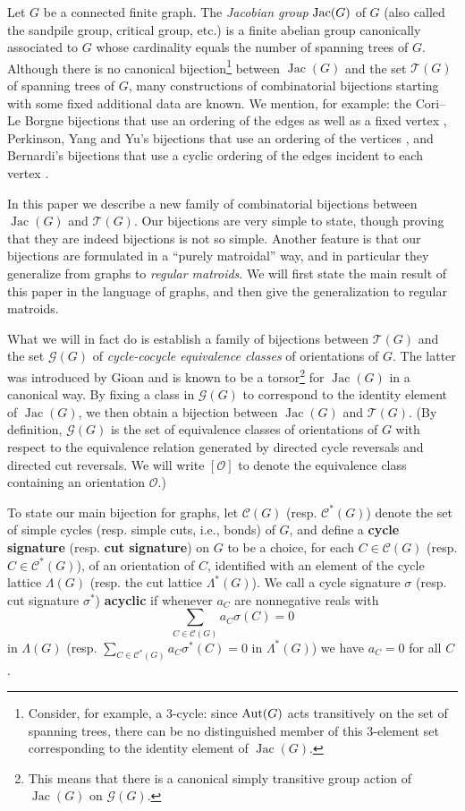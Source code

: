 \documentclass[12pt]{amsart}
\numberwithin{equation}{section}
\theoremstyle{definition}
\newcommand{\Jac}{\operatorname{Jac}}
\begin{document}
Let $G$ be a connected finite graph.
The {\em Jacobian group} ${\rm Jac}(G)$ of $G$ (also called the sandpile group, critical group, etc.) is a finite abelian group canonically associated to $G$ whose cardinality equals the number of spanning trees of $G$. Although there is no canonical bijection\footnote{Consider, for example, a 3-cycle: since ${\rm Aut}(G)$ acts transitively on the set of spanning trees, there can be no distinguished member of this 3-element set corresponding to the identity element of $\Jac(G)$.} between $\Jac(G)$ and the set ${\mathcal T}(G)$ of spanning trees of $G$, many constructions of combinatorial bijections starting with some fixed additional data are known.  We mention, for example: the Cori--Le Borgne bijections that use an ordering of the edges as well as a fixed vertex \cite{cori2001burning}, Perkinson, Yang and Yu's bijections that use an ordering of the vertices \cite{perkinson2015dfs}, and Bernardi's bijections that use a cyclic ordering of the edges incident to each vertex \cite{bernardi2008tutte}.

In this paper we describe a new family of combinatorial bijections between $\Jac(G)$ and ${\mathcal T}(G)$.  Our bijections are very simple to state, though proving that they are indeed bijections is not so simple.  Another feature is that our bijections are formulated in a ``purely matroidal'' way, and in particular they generalize from graphs to {\em regular matroids}.  We will first state the main result of this paper in the language of graphs, and then give the generalization to regular matroids.

What we will in fact do is establish a family of bijections between ${\mathcal T}(G)$ and the set ${\mathcal G}(G)$ of {\em cycle-cocycle equivalence classes} of orientations of $G$.  The latter was introduced by Gioan \cite{gioan2007enumerating,gioan2008circuit} and is known to be a torsor\footnote{This means that there is a canonical simply transitive group action of $\Jac(G)$ on ${\mathcal G}(G)$.} for $\Jac(G)$ in a canonical way. By fixing a class in ${\mathcal G}(G)$ to correspond to the identity element of $\Jac(G)$, we then obtain a bijection between $\Jac(G)$ and ${\mathcal T}(G)$. (By definition, ${\mathcal G}(G)$ is the set of equivalence classes of orientations of $G$ with respect to the equivalence relation generated by directed cycle reversals and directed cut reversals. We will write $[{\mathcal O}]$ to denote the equivalence class containing an orientation ${\mathcal O}$.)

To state our main bijection for graphs, let ${\mathcal C}(G)$ (resp. ${\mathcal C}^*(G)$) denote the set of simple cycles (resp. simple cuts, i.e., bonds) of $G$, and define a {\bf cycle signature} (resp. {\bf cut signature}) on $G$ to be a choice, for each $C \in {\mathcal C}(G)$ (resp. $C \in {\mathcal C}^*(G)$), of an orientation of $C$, identified with an element of the cycle lattice $\Lambda(G)$ (resp. the cut lattice $\Lambda^*(G)$). We call a cycle signature $\sigma$ (resp. cut signature $\sigma^*$) {\bf acyclic} if whenever $a_C$ are nonnegative reals with
\[
\sum_{C \in {\mathcal C}(G)} a_C \sigma(C) = 0
\]
in $\Lambda(G)$ 
(resp. $\sum_{C \in {\mathcal C}^*(G)} a_C \sigma^*(C) = 0$ in $\Lambda^*(G)$) we have $a_C = 0$ for all $C$.
\end{document}
